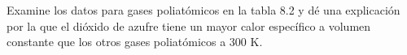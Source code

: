 \item Examine los datos para gases poliatómicos en la tabla 8.2 y dé una explicación por la que el dióxido de azufre tiene un mayor calor específico a volumen constante que los otros gases poliatómicos a 300 K.
